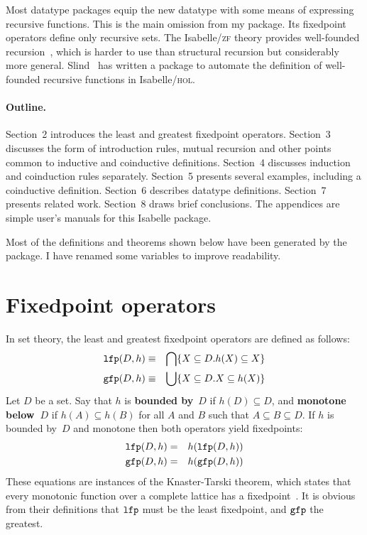 \documentclass[12pt]{article}
\newif\ifshort%
\newcommand\sbs{\subseteq}
\newcommand\defn[1]{{\bf#1}}
\newcommand\lfp{\hbox{\tt lfp}}
\newcommand\gfp{\hbox{\tt gfp}}
\begin{document}
Most datatype packages equip the new datatype with some means of expressing
recursive functions.  This is the main omission from my package.  Its
fixedpoint operators define only recursive sets.  The Isabelle/\textsc{zf}
theory provides well-founded recursion~\cite{paulson-set-II}, which is harder
to use than structural recursion but considerably more general.
Slind~\cite{slind-tfl} has written a package to automate the definition of
well-founded recursive functions in Isabelle/\textsc{hol}.

\paragraph*{Outline.} Section~2 introduces the least and greatest fixedpoint
operators.  Section~3 discusses the form of introduction rules, mutual
recursion and other points common to inductive and coinductive definitions.
Section~4 discusses induction and coinduction rules separately.  Section~5
presents several examples, including a coinductive definition.  Section~6
describes datatype definitions.  Section~7 presents related work.
Section~8 draws brief conclusions.  \ifshort\else The appendices are simple
user's manuals for this Isabelle package.\fi

Most of the definitions and theorems shown below have been generated by the
package.  I have renamed some variables to improve readability.
 
\section{Fixedpoint operators}
In set theory, the least and greatest fixedpoint operators are defined as
follows:
\begin{eqnarray*}
   \lfp(D,h)  & \equiv & \inter\{X\sbs D. h(X)\sbs X\} \\
   \gfp(D,h)  & \equiv & \union\{X\sbs D. X\sbs h(X)\}
\end{eqnarray*}   
Let $D$ be a set.  Say that $h$ is \defn{bounded by}~$D$ if $h(D)\sbs D$, and
\defn{monotone below~$D$} if
$h(A)\sbs h(B)$ for all $A$ and $B$ such that $A\sbs B\sbs D$.  If $h$ is
bounded by~$D$ and monotone then both operators yield fixedpoints:
\begin{eqnarray*}
   \lfp(D,h)  & = & h(\lfp(D,h)) \\
   \gfp(D,h)  & = & h(\gfp(D,h)) 
\end{eqnarray*}   
These equations are instances of the Knaster-Tarski theorem, which states
that every monotonic function over a complete lattice has a
fixedpoint~\cite{davey&priestley}.  It is obvious from their definitions
that $\lfp$ must be the least fixedpoint, and $\gfp$ the greatest.
\end{document}

